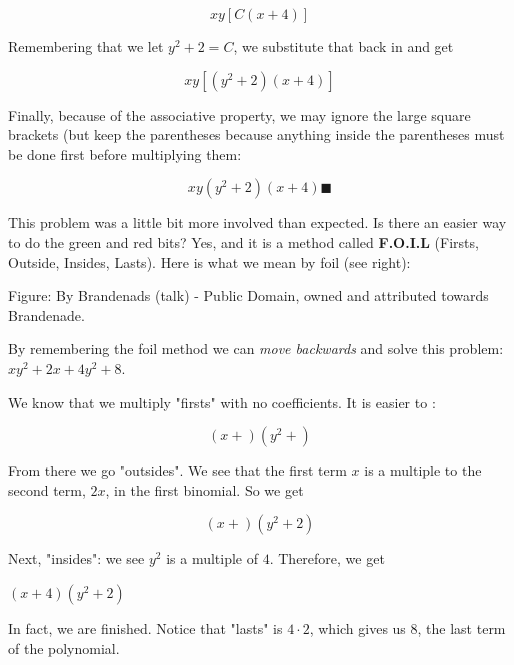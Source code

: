 $$xy\left[C\left(x+4\right)\right]$$



Remembering that we let $y^{2}+2=C$, we substitute that back in and get



$$xy\left[\left(y^{2}+2\right)\left(x+4\right)\right]$$



Finally, because of the associative property, we may ignore the large square brackets (but
keep the parentheses because anything inside the parentheses must be done first before
multiplying them:



$$xy\left(y^{2}+2\right)\left(x+4\right)\blacksquare$$



This problem was a little bit more involved than expected. Is there an easier way to do
the green and red bits? Yes, and it is a method called \textbf{F.O.I.L} (Firsts, Outside,
Insides, Lasts). Here is what we mean by foil (see right):






Figure: By Brandenads (talk) - Public Domain, owned and attributed towards Brandenade.



By remembering the foil method we can \textit{move backwards} and solve this problem:
$xy^{2}+2x+4y^{2}+8$.



We know that we multiply "firsts" with no coefficients. It is easier to :



$$\left(x+ \right)\left(y^{2}+\right)$$



From there we go "outsides". We see that the first term \textbf{$x$} is a multiple to the
second term, $2x$, in the first binomial. So we get



$$\left(x+ \right)\left(y^{2}+2\right)$$



Next, "insides": we see \textbf{$y^{2}$} is a multiple of $4$. Therefore, we get



$(x+4)(y^{2}+2)$



In fact, we are finished. Notice that "lasts" is $4\cdot2$, which gives us $8$, the last
term of the polynomial.



